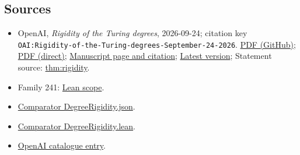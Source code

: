 \documentclass[11pt]{article}
\begin{document}
\subsection{Sources}
\begin{itemize}
\item OpenAI, \emph{Rigidity of the Turing degrees}, 2026-09-24; citation key \texttt{OAI:Rigidity-of-the-Turing-degrees-September-24-2026}. \href{https://github.com/openai/math/blob/adc7f1241b42e322a6451854ab7e4b4c146bf78a/preprints/Rigidity-of-the-Turing-degrees-September-24-2026/paper.pdf}{PDF (GitHub)}; \href{https://github.com/openai/math/raw/adc7f1241b42e322a6451854ab7e4b4c146bf78a/preprints/Rigidity-of-the-Turing-degrees-September-24-2026/paper.pdf}{PDF (direct)}; \href{https://github.com/openai/math/blob/adc7f1241b42e322a6451854ab7e4b4c146bf78a/preprints/Rigidity-of-the-Turing-degrees-September-24-2026/README.md}{Manuscript page and citation}; \href{https://github.com/openai/math/blob/main/preprints/Rigidity-of-the-Turing-degrees-September-24-2026/paper.pdf}{Latest version}; Statement source: \href{https://github.com/openai/math/blob/adc7f1241b42e322a6451854ab7e4b4c146bf78a/preprints/Rigidity-of-the-Turing-degrees-September-24-2026/build/sections/introduction.tex\#L25}{thm:rigidity}.
\item Family 241: \href{https://github.com/openai/math/blob/adc7f1241b42e322a6451854ab7e4b4c146bf78a/lean/docs/241.md}{Lean scope}.
\item \href{https://github.com/openai/math/blob/adc7f1241b42e322a6451854ab7e4b4c146bf78a/lean/ComparatorChallenges/DegreeRigidity.json}{Comparator DegreeRigidity.json}.
\item \href{https://github.com/openai/math/blob/adc7f1241b42e322a6451854ab7e4b4c146bf78a/lean/ComparatorChallenges/DegreeRigidity.lean}{Comparator DegreeRigidity.lean}.
\item \href{https://github.com/openai/math/blob/adc7f1241b42e322a6451854ab7e4b4c146bf78a/CONTENTS.md}{OpenAI catalogue entry}.
\end{itemize}
\end{document}
